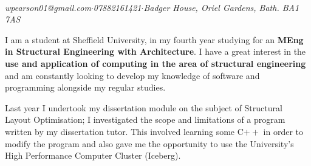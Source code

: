 \documentclass[a4paper]{article}
\begin{document}
\\

\noindent \textit{wpearson01@gmail.com\hspace{5mm}$\cdot$\hspace{5mm}07882161421\hspace{5mm}$\cdot$\hspace{5mm}Badger House, Oriel Gardens, Bath. BA1 7AS}

\small
\vspace{0.8cm}
%

\vspace{0.4cm}

I am a student at Sheffield University, in my fourth year studying for an {\bf MEng in Structural Engineering with Architecture}. I have a great interest in the {\bf use and application of computing in the area of structural engineering} and am constantly looking to develop my knowledge of software and programming alongside my regular studies.

Last year I undertook my dissertation module on the subject of Structural Layout Optimisation; I investigated the scope and limitations of a program written by my dissertation tutor. This involved learning some C$++$ in order to modify the program and also gave me the opportunity to use the University's High Performance Computer Cluster (Iceberg).
\end{document}
